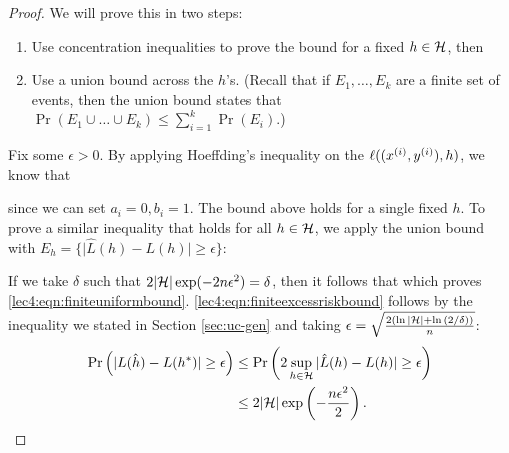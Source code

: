 \begin{proof}
We will prove this in two steps:
\begin{enumerate}
\item Use concentration inequalities to prove the bound for a fixed $h \in \cH$, then
\item Use a union bound across the $h$'s. (Recall that if $E_1, \dots, E_k$ are a finite set of events, then the union bound states that $\Pr ( E_1 \cup \dots \cup E_k) \leq \sum_{i = 1}^k \Pr(E_i)$.)
\end{enumerate}

Fix some $\epsilon > 0$. By applying Hoeffding's inequality on the $\ell( (x\sp{i}, y\sp{i}), h)$, we know that 

since we can set $a_i = 0, b_i = 1$. The bound above holds for a single fixed $h$. To prove a similar inequality that holds for all $h \in \cH$, we apply the union bound with $E_h = \{\vert \hat{L}(h) - L(h) \vert \geq \epsilon \}$:

If we take $\delta$ such that $2\vert \cH \vert \exp(-2n\epsilon^2) = \delta$, then it follows that 
which proves \eqref{lec4:eqn:finiteuniformbound}. \eqref{lec4:eqn:finiteexcessriskbound} follows by the inequality we stated in Section \ref{sec:uc-gen} and taking $\epsilon = \sqrt{\frac{ 2(\ln{\vert \cH \vert} + \ln{(2 / \delta)}) }{n}}$:
\begin{align}
\Pr \left( | L(\hat{h}) - L(h^{*}) | \geq \epsilon \right) &\leq \Pr \left( 2 \sup_{h \in \cH} | \hat{L}(h) - L(h) | \geq \epsilon \right) \\
&\leq 2 |\cH| \exp \left( -\frac{n\epsilon^2}{2} \right).
\end{align}
\end{proof}

